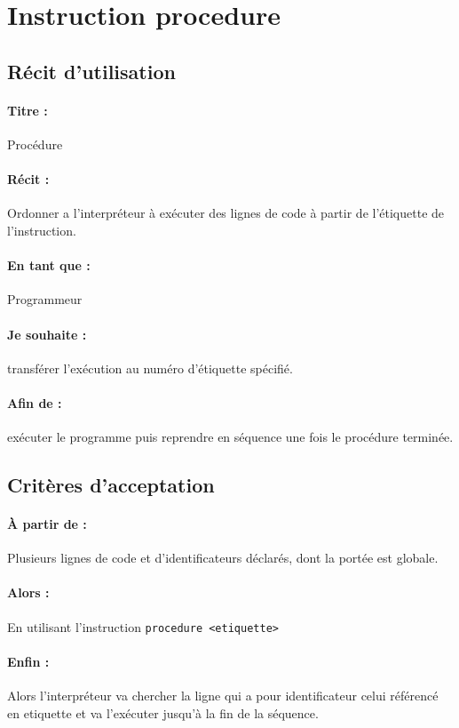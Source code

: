 \section{Instruction procedure}

	\subsection*{Récit d'utilisation}

	\paragraph{Titre : } Procédure
	\paragraph{Récit : } Ordonner a l'interpréteur à exécuter des lignes
						 de code à partir de l'étiquette de l'instruction.
	\paragraph{En tant que : } Programmeur
	\paragraph{Je souhaite : } transférer l'exécution au numéro d'étiquette spécifié.
	\paragraph{Afin de : } exécuter le programme puis reprendre en séquence une fois le procédure terminée.

	\subsection*{Critères d'acceptation}

	\paragraph{À partir de : } Plusieurs lignes de code et d'identificateurs déclarés, dont la portée est globale.

	\paragraph{Alors : } En utilisant l'instruction \verb|procedure <etiquette>|

	\paragraph{Enfin : } Alors l'interpréteur va chercher la ligne qui a pour identificateur celui référencé
						 en etiquette et va l'exécuter jusqu'à la fin de la séquence.

